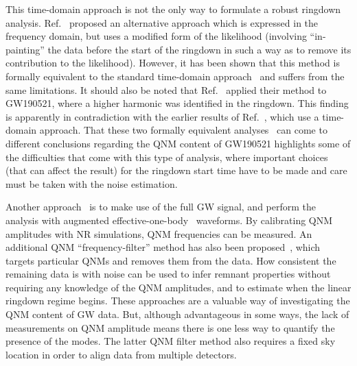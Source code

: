 This time-domain approach is not the only way to formulate a robust ringdown analysis.
Ref.~\cite{Capano:2021etf} proposed an alternative approach which is expressed in the frequency domain, but uses a modified form of the likelihood (involving ``in-painting'' the data before the start of the ringdown in such a way as to remove its contribution to the likelihood).
However, it has been shown that this method is formally equivalent to the standard time-domain approach~\cite{Isi:2021iql} and suffers from the same limitations.
It should also be noted that Ref.~\cite{Capano:2021etf} applied their method to GW190521, where a higher harmonic was identified in the ringdown.
This finding is apparently in contradiction with the earlier results of Ref.~\cite{LIGOScientific:2020tif}, which use a time-domain approach.
That these two formally equivalent analyses~\cite{LIGOScientific:2020tif, Capano:2021etf} can come to different conclusions regarding the QNM content of GW190521 highlights some of the difficulties that come with this type of analysis, where important choices (that can affect the result) for the ringdown start time have to be made and care must be taken with the noise estimation.

Another approach~\cite{Brito:2018rfr} is to make use of the full GW signal, and perform the analysis with augmented effective-one-body~\cite{Buonanno:1998gg} waveforms.
By calibrating QNM amplitudes with NR simulations, QNM frequencies can be measured.
An additional QNM ``frequency-filter'' method has also been proposed~\cite{Ma:2022wpv}, which targets particular QNMs and removes them from the data.
How consistent the remaining data is with noise can be used to infer remnant properties without requiring any knowledge of the QNM amplitudes, and to estimate when the linear ringdown regime begins.
These approaches are a valuable way of investigating the QNM content of GW data. 
But, although advantageous in some ways, the lack of measurements on QNM amplitude means there is one less way to quantify the presence of the modes.
The latter QNM filter method also requires a fixed sky location in order to align data from multiple detectors.

